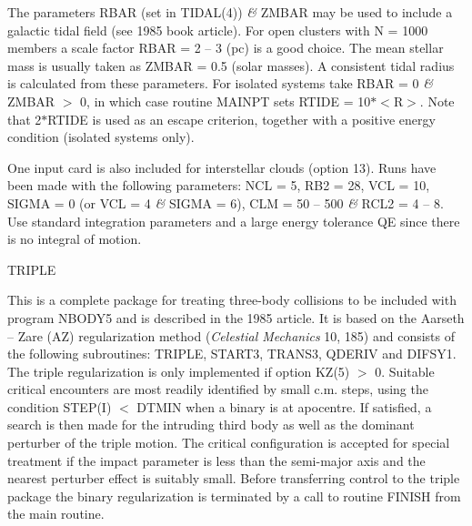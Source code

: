  The parameters RBAR (set in TIDAL(4)) {\it\&} ZMBAR may be used to 
 include a galactic tidal
 field (see 1985 book article).  For open clusters with N = 1000 members
 a scale factor RBAR = 2 -- 3 (pc) is a good
 choice.  The mean stellar mass is usually taken as ZMBAR = 0.5 (solar
 masses).  A consistent tidal radius is calculated from these parameters.  For
 isolated systems take RBAR = 0 {\it\&} ZMBAR $>$ 0, in which case 
 routine MAINPT sets RTIDE = 10$\ast$$<$R$>$.
 Note that 2$\ast$RTIDE is used as an escape criterion, together 
 with a positive energy condition (isolated systems only).

 One input card is also included for interstellar clouds (option 13).  Runs
 have been made with the following parameters: NCL = 5, RB2 = 28, VCL = 10,
 SIGMA = 0 (or VCL = 4 {\it\&} SIGMA = 6), CLM = 50 -- 500 {\it\&} RCL2 = 4 -- 8.  
 Use standard integration parameters and a large energy tolerance 
 QE since there is no integral of motion.
\bigskip
\bigskip
\centerline {TRIPLE}
\bigskip

 This is a complete package for treating three-body collisions to be included with program NBODY5                
   and is described in the 1985 article.  It is based on the Aarseth -- Zare (AZ) regularization method                          
   ({\it Celestial Mechanics} 10, 185) and consists of the following subroutines:  TRIPLE, START3, TRANS3,                    
   QDERIV and DIFSY1.  The triple regularization is only implemented if option KZ(5) $>$ 0.  Suitable                     
   critical encounters are most readily identified by small c.m. steps, using the condition STEP(I) $<$                   
   DTMIN when a binary is at apocentre.  If satisfied, a search is then made for the intruding third                    
   body as well as the dominant perturber of the triple motion.  The critical configuration is accepted                 
   for special treatment if the impact parameter is less than the semi-major axis and the nearest                       
   perturber effect is suitably small.  Before transferring control to the triple package the binary                    
   regularization is terminated by a call to routine FINISH from the main routine.                                      

